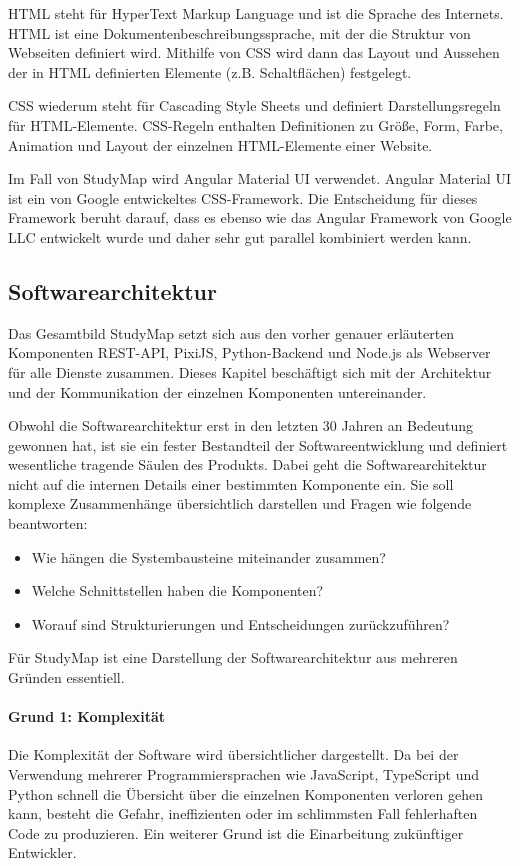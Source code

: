 HTML steht für HyperText Markup Language und ist die Sprache des Internets. HTML ist eine Dokumentenbeschreibungssprache, mit der die Struktur von Webseiten definiert wird. Mithilfe von CSS wird dann das Layout und Aussehen der in HTML definierten Elemente (z.B. Schaltflächen) festgelegt. \parencite{mozilla_corporation_html_2023}

CSS wiederum steht für Cascading Style Sheets und definiert Darstellungsregeln für HTML-Elemente. CSS-Regeln enthalten Definitionen zu Größe, Form, Farbe, Animation und Layout der einzelnen HTML-Elemente einer Website. \parencite{mozilla_corporation_what_2024}

Im Fall von StudyMap wird Angular Material UI verwendet. Angular Material UI ist ein von Google entwickeltes CSS-Framework. Die Entscheidung für dieses Framework beruht darauf, dass es ebenso wie das Angular Framework von Google LLC entwickelt wurde und daher sehr gut parallel kombiniert werden kann. \parencite{google_llc_angular_2024}
\subsection{Softwarearchitektur}
Das Gesamtbild StudyMap setzt sich aus den vorher genauer erläuterten Komponenten REST-API, PixiJS, Python-Backend und Node.js als Webserver für alle Dienste zusammen. Dieses Kapitel beschäftigt sich mit der Architektur und der Kommunikation der einzelnen Komponenten untereinander.

Obwohl die Softwarearchitektur erst in den letzten 30 Jahren an Bedeutung gewonnen hat, ist sie ein fester Bestandteil der Softwareentwicklung und definiert wesentliche tragende Säulen des Produkts. Dabei geht die Softwarearchitektur nicht auf die internen Details einer bestimmten Komponente ein. \parencite{vogel_einleitung_2009} Sie soll komplexe Zusammenhänge übersichtlich darstellen und Fragen wie folgende beantworten:
\begin{itemize}
    \item Wie hängen die Systembausteine miteinander zusammen?
    \item Welche Schnittstellen haben die Komponenten?
    \item Worauf sind Strukturierungen und Entscheidungen zurückzuführen?
\end{itemize}

Für StudyMap ist eine Darstellung der Softwarearchitektur aus mehreren Gründen essentiell.

\paragraph*{Grund 1: Komplexität}
Die Komplexität der Software wird übersichtlicher dargestellt. Da bei der Verwendung mehrerer Programmiersprachen wie JavaScript, TypeScript und Python schnell die Übersicht über die einzelnen Komponenten verloren gehen kann, besteht die Gefahr, ineffizienten oder im schlimmsten Fall fehlerhaften Code zu produzieren. Ein weiterer Grund ist die Einarbeitung zukünftiger Entwickler.

